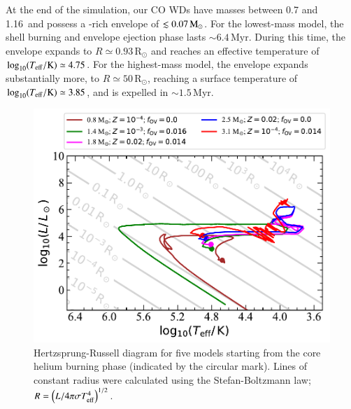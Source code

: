 \documentclass[main.tex]{subfiles}
\begin{document}
At the end of the simulation, our CO WDs have masses between 0.7 and 1.16\msun\ and possess a -rich envelope of $\lesssim 0.07\mathrm{\,M_\odot}$. For the lowest-mass model, the shell burning and 
envelope ejection phase lasts $\sim 6.4\,\text{Myr}$. During this time, the envelope expands to $R \simeq 0.93$\,R$_\odot$ and reaches an effective temperature of 
$\log_{10} (T_{\rm{eff}}/{\rm K}) \simeq 4.75$. For the highest-mass model, the 
envelope expands substantially more, to $R \simeq 50$\,R$_\odot$, reaching a surface 
temperature of $\log_{10} (T_{\rm{eff}}/{\rm K}) \simeq 3.85$, and is expelled in $\sim 1.5$\,Myr.

\begin{figure}[h!]
    \centering
    \includegraphics[width=0.5\columnwidth]{figures/chapter2/hrd/hrd_series1.pdf}
    \caption{Hertzsprung-Russell diagram for five \seriesone models starting from the core helium burning phase (indicated by the circular mark). Lines of constant radius were calculated using the Stefan-Boltzmann law; $R= \left( L/4\pi \sigma T_{\rm eff}^4 \right)^{1/2}$.}
    \label{fig:hrd_series1}
\end{figure}
\end{document}
